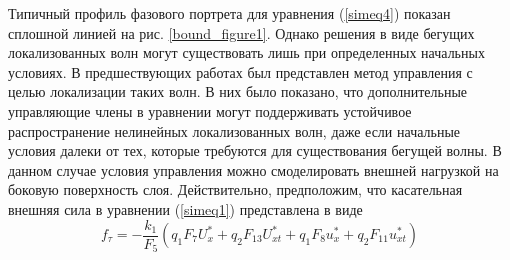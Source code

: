 
Типичный профиль фазового портрета для уравнения (\ref{simeq4}) показан сплошной линией на рис. \ref{bound_figure1}. Однако решения в виде бегущих локализованных волн могут существовать лишь при определенных начальных условиях. В предшествующих работах \cite{bound_fradkov, porant16, bound_porandr17} был представлен метод управления с целью локализации таких волн. В них было показано, что дополнительные управляющие члены в уравнении могут поддерживать устойчивое распространение нелинейных локализованных волн, даже если начальные условия далеки от тех, которые требуются для существования бегущей волны. В данном случае условия управления можно смоделировать внешней нагрузкой на боковую поверхность слоя. Действительно, предположим, что касательная внешняя сила в уравнении (\ref{simeq1}) представлена в виде
\begin{equation}
	f_\tau=-\frac{k_1}{F_5}\left(q_1 F_7 U^*_x+q_2 F_{13} U^*_{xt}+q_1 F_8 u^*_x+q_2 F_{11} u^*_{xt}\right) \label{control}
\end{equation}

